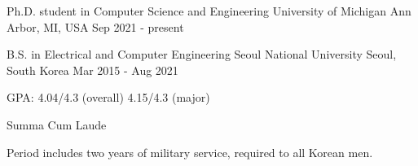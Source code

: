 

\begin{cventries}

  \cventry
    {Ph.D. student in Computer Science and Engineering}
    {University of Michigan} %
    {Ann Arbor, MI, USA} %
    {Sep 2021 - present} %
    {
    }
    
  \cventry
    {B.S. in Electrical and Computer Engineering}
    {Seoul National University} %
    {Seoul, South Korea} %
    {Mar 2015 - Aug 2021} %
    {
      \begin{cvitems} %
        \item {GPA: 4.04/4.3 (overall) 4.15/4.3 (major)}
        \item {Summa Cum Laude}
        \item {Period includes two years of military service, required to all Korean men.}
      \end{cvitems}
    }
    
\end{cventries}
